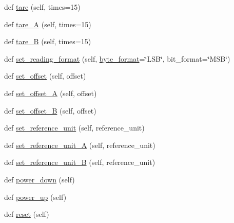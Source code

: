 \begin{DoxyCompactItemize}
def \hyperlink{classhx711_1_1HX711_a6939b23087c747bf2519776fe84670b9}{tare} (self, times=15)
\item 
def \hyperlink{classhx711_1_1HX711_a259f1da59370d307d11590f5c849ad65}{tare\+\_\+A} (self, times=15)
\item 
def \hyperlink{classhx711_1_1HX711_a140e5b631075f470254b3565a343387b}{tare\+\_\+B} (self, times=15)
\item 
def \hyperlink{classhx711_1_1HX711_ae125f844075bc5127d18a6c0142b111d}{set\+\_\+reading\+\_\+format} (self, \hyperlink{classhx711_1_1HX711_adbea87f8936ada715b6ae5687c1e7de3}{byte\+\_\+format}=\char`\"{}L\+SB\char`\"{}, bit\+\_\+format=\char`\"{}M\+SB\char`\"{})
\item 
def \hyperlink{classhx711_1_1HX711_a21359f3142d64438b560b91ea0fd69ed}{set\+\_\+offset} (self, offset)
\item 
def \hyperlink{classhx711_1_1HX711_aa43306d5bd7e3fa4ca53f1dc1549d67a}{set\+\_\+offset\+\_\+A} (self, offset)
\item 
def \hyperlink{classhx711_1_1HX711_acc5d6458dfe89691c4640ff0ed0cf2aa}{set\+\_\+offset\+\_\+B} (self, offset)
\item 
def \hyperlink{classhx711_1_1HX711_ae0ed4ca962c1645b92c94fe0a68ef7b5}{set\+\_\+reference\+\_\+unit} (self, reference\+\_\+unit)
\item 
def \hyperlink{classhx711_1_1HX711_a05916ea32c8612b891f7442d8a8d6871}{set\+\_\+reference\+\_\+unit\+\_\+A} (self, reference\+\_\+unit)
\item 
def \hyperlink{classhx711_1_1HX711_a7ff68f12b57a22c1ac2d5be7976862b8}{set\+\_\+reference\+\_\+unit\+\_\+B} (self, reference\+\_\+unit)
\item 
def \hyperlink{classhx711_1_1HX711_ae633dba08439ad21d953e33b7c68b0e6}{power\+\_\+down} (self)
\item 
def \hyperlink{classhx711_1_1HX711_a1902a5b8146ea9080155bf64bc321af9}{power\+\_\+up} (self)
\item 
def \hyperlink{classhx711_1_1HX711_af22b5bf95c6c6763a31abd9f077e8395}{reset} (self)
\end{DoxyCompactItemize}
